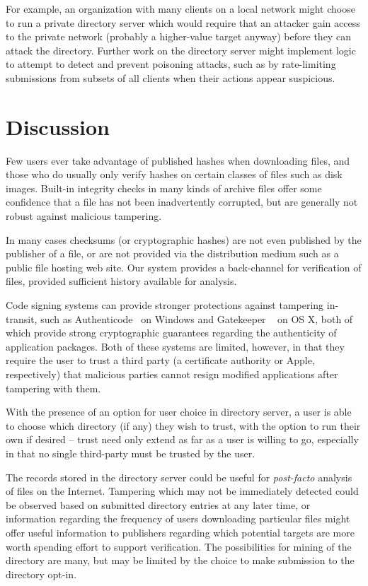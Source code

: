 \documentclass[letterpaper,twocolumn,10pt]{article}
\begin{document}
For example,
an organization with many clients on a local network might choose to run a private directory
server which would require that an attacker gain access to the private network (probably
a higher-value target anyway) before they can attack the directory.
Further work on the directory server might implement logic to attempt to detect and prevent
poisoning attacks, such as by rate-limiting submissions from subsets of all clients when
their actions appear suspicious.

\section{Discussion}

Few users ever take advantage of published hashes when downloading files, and those
who do usually only verify hashes on certain classes of files such as disk images.
Built-in integrity checks in many kinds of archive files
offer some confidence that a file has not been inadvertently corrupted,
but are generally not robust against malicious tampering.

In many cases checksums (or cryptographic hashes) are not even published by the
publisher of a file, or are not provided via the distribution medium such as a public
file hosting web site. Our system provides a back-channel for verification of files,
provided sufficient history available for analysis.

Code signing systems can provide stronger protections against tampering in-transit,
such as Authenticode~\cite{Authenticode} on Windows and Gatekeeper
~\cite{Gatekeeper} on OS X, both of which provide strong cryptographic
guarantees regarding the authenticity of application packages. Both of these
systems are limited, however, in that they require the user to trust a third party
(a certificate authority or Apple, respectively) that malicious parties cannot resign
modified applications after tampering with them.

With the presence of an option for user choice in directory server, a user
is able to choose which directory (if any) they wish to trust, with the option
to run their own if desired -- trust need only extend as far as a user is willing
to go, especially in that no single third-party must be trusted by the user.

The records stored in the directory server could be useful for \emph{post-facto} analysis
of files on the Internet. Tampering which may not be immediately detected could be
observed based on submitted directory entries at any later time, or information
regarding the frequency of users downloading particular files might offer useful information
to publishers regarding which potential targets are more worth spending effort
to support verification. The possibilities for mining of the directory are many, but
may be limited by the choice to make submission to the directory opt-in.
\end{document}
